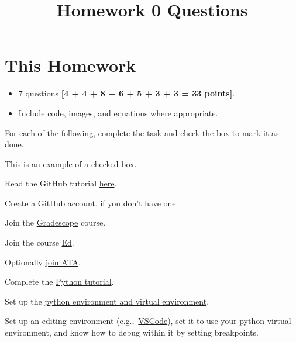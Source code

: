 \documentclass{csci1430}
\begin{document}
\title{Homework 0 Questions}
\maketitle
\thispagestyle{fancy}

\writeinstructions

\section*{This Homework}
\begin{itemize}
  \item 7 questions \textbf{[4 + 4 + 8 + 6 + 5 + 3 + 3 = 33 points]}.
  \item Include code, images, and equations where appropriate.
\end{itemize}

\pagebreak %

\begin{question}[points=4]
For each of the following, complete the task and check the box to mark it as done.
\end{question}

\begin{answerlist}
    \item[\done] This is an example of a checked box.
    \item Read the GitHub tutorial \href{https://browncsci1430.github.io/resources/github_guide/}{here}.
    \item Create a GitHub account, if you don't have one.
    \item Join the \href{https://www.gradescope.com/}{Gradescope} course.
    \item Join the course \href{https://edstem.org/}{Ed}.
    \item Optionally \href{https://talktoata.com/join/brown-university-csci1430-spring-2025}{join ATA}.
    \item Complete the \href{https://colab.research.google.com/drive/1K42Mk-CPl8Azql5SJRE9xfkiNwRyo9rs?usp=sharing}{Python tutorial}.
    \item Set up the \href{https://browncsci1430.github.io/resources/python_setup/}{python environment and virtual environment}.
    \item Set up an editing environment (e.g.,~\href{https://browncsci1430.github.io/resources/vscode_setup/}{VSCode}), set it to use your python virtual environment, and know how to debug within it by setting breakpoints.
\end{answerlist}
\end{document}
